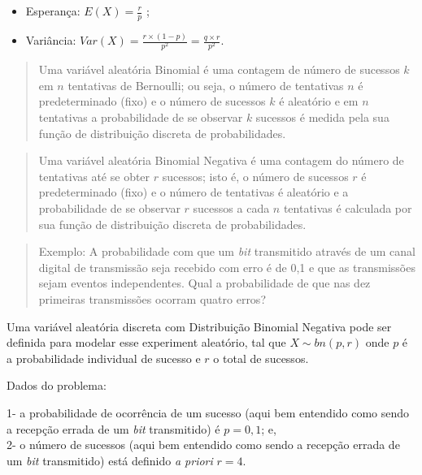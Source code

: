 \documentclass[
]{book}
\providecommand{\tightlist}{%
  \setlength{\itemsep}{0pt}\setlength{\parskip}{0pt}}
\begin{document}
\begin{itemize}
\tightlist
\item
  Esperança: \(E(X) = \frac{r}{p}\) ;\\
\item
  Variância: \(Var(X) = \frac{r \times (1-p)}{p^{2}} = \frac{q \times r}{p^{2}}\).
\end{itemize}

\hfill\break

\begin{quote}
Uma variável aleatória Binomial é uma contagem de número de sucessos \(k\) em \(n\) tentativas de Bernoulli; ou seja, o número de tentativas \(n\) é predeterminado (fixo) e o número de sucessos \(k\) é aleatório e em \(n\) tentativas a probabilidade de se observar \(k\) sucessos é medida pela sua função de distribuição discreta de probabilidades.
\end{quote}

\begin{quote}
Uma variável aleatória Binomial Negativa é uma contagem do número de tentativas até se obter \(r\) sucessos; isto é, o número de sucessos \(r\) é predeterminado (fixo) e o número de tentativas é aleatório e a probabilidade de se observar \(r\) sucessos a cada \(n\) tentativas é calculada por sua função de distribuição discreta de probabilidades.
\end{quote}

\hfill\break

\begin{quote}
Exemplo: A probabilidade com que um \emph{bit} transmitido através de um canal digital de transmissão seja recebido com erro é de 0,1 e que as transmissões sejam eventos independentes. Qual a probabilidade de que nas dez primeiras transmissões ocorram quatro erros?
\end{quote}

\hfill\break

Uma variável aleatória discreta com Distribuição Binomial Negativa pode ser definida para modelar esse experiment aleatório, tal que \(X\sim bn(p,r)\) onde \(p\) é a probabilidade individual de sucesso e \(r\) o total de sucessos.

\hfill\break

Dados do problema:

\hfill\break

1- a probabilidade de ocorrência de um sucesso (aqui bem entendido como sendo a recepção errada de um \emph{bit} transmitido) é \(p=0,1\); e,\\
2- o número de sucessos (aqui bem entendido como sendo a recepção errada de um \emph{bit} transmitido) está definido \emph{a priori} \(r=4\).
\end{document}
